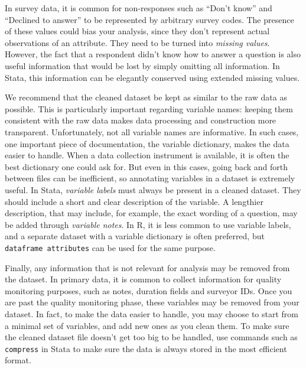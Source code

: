 In survey data, it is common for non-responses such as ``Don't know'' and ``Declined to answer''
to be represented by arbitrary survey codes. 
The presence of these values could bias your analysis,
since they don't represent actual observations of an attribute.
They need to be turned into \textit{missing values}.
However, the fact that a respondent didn't know how to answer a question is also useful information
that would be lost by simply omitting all information.
In Stata, this information can be elegantly conserved using extended missing values.

We recommend that the cleaned dataset be kept as similar to the raw data as possible.
This is particularly important regarding variable names:
keeping them consistent with the raw data makes data processing and construction more transparent.
Unfortunately, not all variable names are informative.
In such cases, one important piece of documentation,
the variable dictionary, makes the data easier to handle.
When a data collection instrument is available, 
it is often the best dictionary one could ask for.
But even in this cases, going back and forth between files can be inefficient,
so annotating variables in a dataset is extremely useful.
In Stata, \textit{variable labels} must always be present in a cleaned dataset.
They should include a short and clear description of the variable.
A lengthier description, that may include, for example,
the exact wording of a question, may be added through \textit{variable notes}.
In R, it is less common to use variable labels,
and a separate dataset with a variable dictionary is often preferred,
but \texttt{dataframe attributes} can be used for the same purpose.

Finally, any information that is not relevant for analysis may be removed from the dataset.
In primary data, it is common to collect information for quality monitoring purposes,
such as notes, duration fields and surveyor IDs.
Once you are past the quality monitoring phase,
these variables may be removed from your dataset.
In fact, to make the data easier to handle,
you may choose to start from a minimal set of variables,
and add new ones as you clean them.
To make sure the cleaned dataset file doesn't get too big to be handled,
use commands such as \texttt{compress} in Stata to make sure the data
is always stored in the most efficient format.

